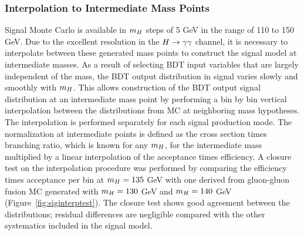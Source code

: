 

\subsubsection{Interpolation to Intermediate Mass Points}

Signal Monte Carlo is available in $m_{H}$ steps of 5 GeV in the range of 110 to 150 GeV. 
Due to the excellent resolution in the $H\rightarrow\gamma\gamma$ channel, it is necessary to interpolate 
between these generated mass points to construct the signal model at intermediate masses.
As a result of selecting BDT input variables that are largely independent of the mass, the BDT output distribution in signal
varies slowly and smoothly with $m_{H}$. This allows construction of the BDT output signal distribution at an 
intermediate mass point by performing a bin by bin vertical interpolation between the distributions
from MC at neighboring mass hypotheses. 
The interpolation is performed separately for each signal production mode. 
The normalization at intermediate points is defined
as the cross section times branching ratio, which is known for any $m_{H}$, 
for the intermediate mass multiplied by a linear interpolation of the acceptance times efficiency. 
A closure test on the interpolation procedure
was performed by comparing the efficiency times acceptance per bin at $m_{H}=135$ GeV with one derived from 
gluon-gluon fusion MC generated with $m_{H}=130$ GeV and $m_{H}=140$ GeV (Figure~\ref{fig:siginterptest}). 
The closure test shows good agreement between the distributions;
residual differences are negligible compared with the other systematics included in the signal model.

